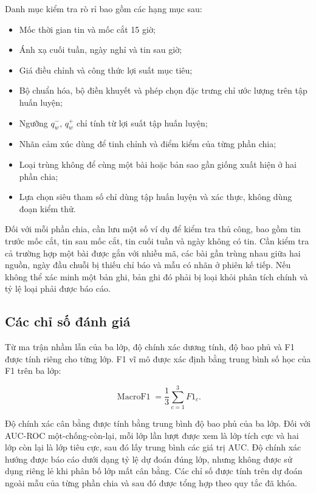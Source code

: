 \documentclass[12pt, a4paper, oneside]{report}
\begin{document}
Danh mục kiểm tra rò rỉ bao gồm các hạng mục sau:

\begin{itemize}[nosep]
  \item Mốc thời gian tin và mốc cắt 15 giờ;
  \item Ánh xạ cuối tuần, ngày nghỉ và tin sau giờ;
  \item Giá điều chỉnh và công thức lợi suất mục tiêu;
  \item Bộ chuẩn hóa, bộ điền khuyết và phép chọn đặc trưng chỉ ước lượng trên tập huấn luyện;
  \item Ngưỡng $q^-_w$, $q^+_w$ chỉ tính từ lợi suất tập huấn luyện;
  \item Nhãn cảm xúc dùng để tinh chỉnh và điểm kiểm của từng phần chia;
  \item Loại trùng không để cùng một bài hoặc bản sao gần giống xuất hiện ở hai phần chia;
  \item Lựa chọn siêu tham số chỉ dùng tập huấn luyện và xác thực, không dùng đoạn kiểm thử.
\end{itemize}

Đối với mỗi phần chia, cần lưu một số ví dụ để kiểm tra thủ công, bao gồm tin trước
mốc cắt, tin sau mốc cắt, tin cuối tuần và ngày không có tin. Cần kiểm tra cả trường hợp một bài được gắn với nhiều mã, các bài gần trùng nhau giữa
hai nguồn, ngày đầu chuỗi bị thiếu chỉ báo và mẫu có nhãn ở phiên kế tiếp. Nếu không
thể xác minh một bản ghi, bản ghi đó phải bị loại khỏi phân tích chính và tỷ lệ loại
phải được báo cáo.

\subsection{Các chỉ số đánh giá}

Từ ma trận nhầm lẫn của ba lớp, độ chính xác dương tính, độ bao phủ và F1 được tính
riêng cho từng lớp. F1 vĩ mô được xác định bằng trung bình số học của F1 trên ba lớp:

\begin{equation}
  \operatorname{MacroF1}=\frac{1}{3}\sum_{c=1}^{3}F1_c.
  \label{eq:macro-f1}
\end{equation}

Độ chính xác cân bằng được tính bằng trung bình độ bao phủ của ba lớp. Đối với
AUC-ROC một-chống-còn-lại, mỗi lớp lần lượt được xem là lớp tích cực và hai lớp còn
lại là lớp tiêu cực, sau đó lấy trung bình các giá trị AUC. Độ chính xác hướng được
báo cáo dưới dạng tỷ lệ dự đoán đúng lớp, nhưng không được sử dụng riêng lẻ khi phân
bố lớp mất cân bằng. Các chỉ số được tính trên dự đoán ngoài mẫu của từng phần chia
và sau đó được tổng hợp theo quy tắc đã khóa.
\end{document}
